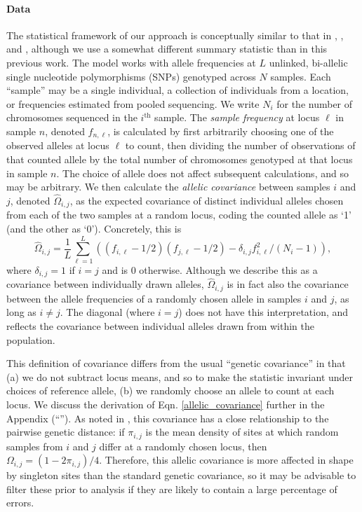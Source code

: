 \documentclass[12pt]{article}
\newcommand{\secref}[1]{``\nameref{#1}''}
\begin{document}
\paragraph{Data}
The statistical framework of our approach is conceptually similar to that in \cite{Wasser2004}, \cite{BEDASSLE}, and \cite{spacemix},
although we use a somewhat different summary statistic than in this previous work.
The model works with allele frequencies at $L$ unlinked, bi-allelic single nucleotide polymorphisms (SNPs) genotyped across $N$ samples.
Each ``sample'' may be a single individual,  
a collection of individuals from a location, 
or frequencies estimated from pooled sequencing.
We write $N_i$ for the number of chromosomes sequenced in the $i^\text{th}$ sample.
The \emph{sample frequency} at locus $\ell$ in sample $n$, denoted $f_{n,\ell}$, 
is calculated by first arbitrarily choosing one of the observed alleles at locus $\ell$ to count, 
then dividing the number of observations of that counted allele by the total number of chromosomes genotyped at that locus
in sample $n$.
The choice of allele does not affect subsequent calculations, and so may be arbitrary.
We then calculate the \emph{allelic covariance} between samples $i$ and $j$, denoted $\widehat{\Omega}_{i,j}$,
as the expected covariance of distinct individual alleles 
chosen from each of the two samples at a random locus,
coding the counted allele as `1' (and the other as `0').
Concretely, this is
\begin{equation}
\widehat{\Omega}_{i,j} = 
    \frac{1}{L} \sum_{\ell=1}^L \left( (f_{i,\ell}-1/2) (f_{j,\ell}-1/2) - \delta_{i,j} f_{i,\ell}^2 / (N_i-1) \right),
\label{allelic_covariance}
\end{equation}
where $\delta_{i,j}=1$ if $i=j$ and is 0 otherwise.
Although we describe this as a covariance between individually drawn alleles,
$\widehat{\Omega}_{i,j}$ is in fact also the covariance between the allele frequencies
of a randomly chosen allele in samples $i$ and $j$, as long as $i \neq j$.
The diagonal (where $i=j$) does not have this interpretation, 
and reflects the covariance between individual alleles drawn from within the population.

This definition of covariance differs from the usual ``genetic covariance'' \citep{mcvean_genealogical_2009}
in that (a) we do not subtract locus means,
and so to make the statistic invariant under choices of reference allele, 
(b) we randomly choose an allele to count at each locus.
We discuss the derivation of Eqn. \eqref{allelic_covariance} further in the Appendix (\secref{allelic_cov}).
As noted in \cite{EEMS},
this covariance has a close relationship to the pairwise genetic distance:
if $\pi_{i,j}$ is the mean density of sites at which random samples from $i$ and $j$ differ at a randomly chosen locus,
then $\Omega_{i,j} = (1 - 2 \pi_{i,j})/4$.
Therefore, 
this allelic covariance is more affected in shape by singleton sites
than the standard genetic covariance,
so it may be advisable to filter these prior to analysis
if they are likely to contain a large percentage of errors.
\end{document}
